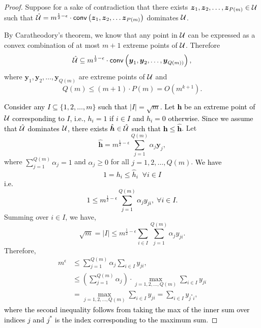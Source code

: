 \documentclass[11pt]{article}
\theoremstyle{plain}
\theoremstyle{definition}
\numberwithin{equation}{section}%
\numberwithin{equation}{section}%
\newcommand{\mb}[1]{\ensuremath{\boldsymbol{#1}}}
\newcommand*{\red}{\textcolor{black}}
\begin{document}
\begin{proof}
Suppose for a sake of contradiction that there exists $\mb{z}_1,\mb{z}_2,\ldots,\mb{z}_{P(m)} \in {\cal U}$ such that ${\hat{\cal U}}= m^{\frac{1}{2}-\epsilon} \cdot { \sf{conv}} \left( \mb{z}_1,\mb {z}_2,\ldots\mb{z}_{P(m)}\right)$ dominates  ${\cal U}$.

By Caratheodory's theorem, we know that any point in ${\cal U}$ can be expressed as a convex combination of at most $m+1$ extreme points of ${\cal U}$. Therefore
$${\hat{\cal U}} \subseteq m^{\frac{1}{2}-\epsilon} \cdot { \sf{conv}} \left( \mb {y}_1,\mb {y}_2,\ldots, \mb{y}_{Q(m))}\right), $$
where $\mb{y}_1,\mb{y}_2,\ldots,\mb{y}_{Q(m)} $ are extreme points of ${\cal U}$ and $$Q(m) \leq  (m+1) \cdot P(m) = O(m^{k+1}).$$

\red{Consider any $ I \subseteq \{1,2,\ldots,m\}$ such that $ \vert I \vert = \sqrt{m}$. Let $ {\mb h}$ be an extreme point of ${\cal U}$ corresponding to $I$, i.e., $ h_i= 1 $ if $ i \in I$ and $  h_i= 0 $ otherwise. Since we assume that $\hat{\cal U}$ dominates $\cal U$,  there exists $ {\hat{\mb h}} \in {\hat{\cal U}}$ such that $ \mb h \leq \hat{\mb h}$}. Let
$$ {\hat{\mb h}}=m^{\frac{1}{2}-\epsilon}  \sum_{j=1}^{Q(m)} { \alpha}_j \mb{y}_j,$$ where $ \sum_{j=1}^{Q(m)} { \alpha}_j=1$ and ${ \alpha}_j \geq 0 $ for all $j=1,2,\ldots,Q(m)$. \red{We have
$$ 1= h_i \leq \hat{h}_i \; \; \forall i \in I$$
i.e.
$$ 1 \leq m^{\frac{1}{2}-\epsilon}  \sum_{j=1}^{Q(m)} { \alpha}_j {y_{ji}}, \; \forall i \in I.$$ }
Summing over $i \in I$, we have,
\[\sqrt{m}= \vert I \vert \leq m^{\frac{1}{2}-\epsilon}  \sum_{i \in I} \sum_{j=1}^{Q(m)} { \alpha}_j {y_{ji}}.\]
Therefore,
\[
\begin{aligned}
 m^{\epsilon} & \leq   \sum_{j=1}^{Q(m)} { \alpha}_j \sum_{i \in I}  {y_{ji}}, \\
 &  \leq \left(  \sum_{j=1}^{Q(m)} { \alpha}_j \right) \cdot \underset{ j=1,2,\ldots,Q(m)} \max\sum_{i \in I}  {y_{ji}}\\
 &=  \underset{ j=1,2,\ldots,Q(m)} \max\sum_{i \in I}  {y_{ji}} = \sum_{i \in I}  {y_{j^*i}},
\end{aligned}
\]
\red{where the second inequality follows from taking the max of the inner sum over indices $j$ and  $j^*$ is the index corresponding to the maximum sum.}


\end{proof}
\end{document}
